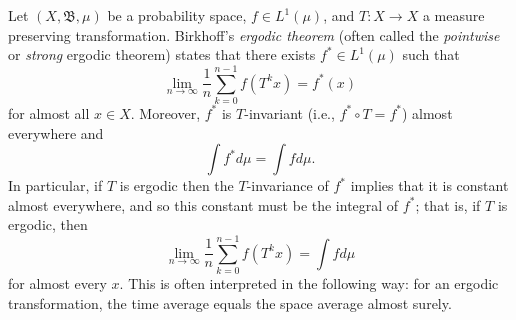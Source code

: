 \documentclass{article}
\newcommand{\borel}{\mathfrak{B}}
\begin{document}
Let $(X, \borel, \mu)$ be a probability space, $f \in L^1(\mu)$, and $T\colon X \to X$ a measure preserving transformation.  Birkhoff's \emph{ergodic theorem} (often called the \emph{pointwise} or \emph{strong} ergodic theorem) states that there exists $f^*\in L^1(\mu)$ such that
\begin{equation*}
\lim_{n\to\infty}\frac{1}{n}\sum_{k=0}^{n-1} f(T^k x) = f^*(x)
\end{equation*}
for almost all $x\in X$. Moreover, $f^*$ is $T$-invariant (i.e., $f^*\circ T = f^*$) almost everywhere and $$\int f^*d\mu = \int f d\mu.$$ 
In particular, if $T$ is ergodic then the $T$-invariance of $f^*$ implies that it is constant almost everywhere, and so this constant must be the integral of $f^*$; that is, if $T$ is ergodic, then 
$$\lim_{n\to\infty}\frac{1}{n}\sum_{k=0}^{n-1} f(T^k x) = \int fd\mu$$ 
for almost every $x$. This is often interpreted in the following way: for an ergodic transformation, the time average equals the space average almost surely.
\end{document}
